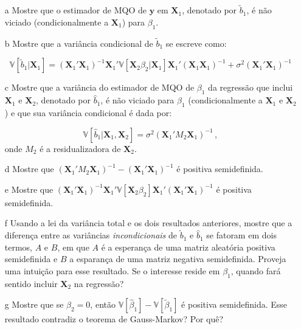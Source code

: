 \documentclass[10pt,a4paper]{article}
\begin{document}
 \begin{itemize}
 	\item[a] Mostre que o estimador de MQO de $\boldsymbol{y}$ em $\boldsymbol{X}_1$, denotado por $\tilde{b}_1$, é não viciado (condicionalmente a $\boldsymbol{X}_1$) para $\beta_1$.
 	\item[b] Mostre que a variância condicional de $\tilde{b}_1$ se escreve como:
 	
 	$$\mathbb{V}[\tilde{b}_1|\boldsymbol{X}_1] = 	(\boldsymbol{X}_1'\boldsymbol{X}_1)^{-1}\boldsymbol{X}_1'\mathbb{V}[\boldsymbol{X}_2\beta_2|\boldsymbol{X}_1]\boldsymbol{X}_1'(\boldsymbol{X}_1\boldsymbol{X}_1)^{-1} + \sigma^2 (\boldsymbol{X}_1'\boldsymbol{X}_1)^{-1}$$
 	
 	\item[c] Mostre que a variância do estimador de MQO de $\beta_1$ da regressão que inclui $\boldsymbol{X}_1$ e $\boldsymbol{X}_2$, denotado por $\hat{b}_1$, é não viciado para $\beta_1$ (condicionalmente a $\boldsymbol{X}_1$ e $\boldsymbol{X}_2$) e que sua variância condicional é dada por:
 	
 	$$\mathbb{V}[\hat{b}_1|\boldsymbol{X}_1,\boldsymbol{X}_2] = \sigma^2\left(\boldsymbol{X}_1'M_2 \boldsymbol{X}_1\right)^{-1}\, , $$
 	onde $M_2$ é a residualizadora de $\boldsymbol{X}_2$.
 	
 	\item[d] Mostre que $\left(\boldsymbol{X}_1'M_2 \boldsymbol{X}_1\right)^{-1} - (\boldsymbol{X}_1'\boldsymbol{X}_1)^{-1}$ é positiva semidefinida.
 	
 	\item[e] Mostre que $(\boldsymbol{X}_1'\boldsymbol{X}_1)^{-1}\boldsymbol{X}_1'\mathbb{V}[\boldsymbol{X}_2\beta_2]\boldsymbol{X}_1'(\boldsymbol{X}_1'\boldsymbol{X}_1)^{-1} $ é positiva semidefinida.
 	
 	\item[f] Usando a  lei da variância total e os dois resultados anteriores, mostre que a diferença entre as variâncias \emph{incondicionais} de $\tilde{b}_1$ e $\hat{b}_1$ se fatoram em dois termos, $A$ e $B$, em que $A$ é a esperança de uma matriz aleatória positiva semidefinida e $B$ a esparança de uma matriz negativa semidefinida. Proveja uma intuição para esse resultado. Se o interesse reside em $\beta_1$, quando fará sentido incluir $\boldsymbol{X}_2$ na regressão?
 	\item[g] Mostre que se $\beta_2 = 0$, então  $\mathbb{V}[\hat{\beta}_1] - \mathbb{V}[\tilde{\beta}_1] $ é positiva semidefinida. Esse resultado contradiz o teorema de Gauss-Markov? Por quê?
 \end{itemize}
 
\end{document}
